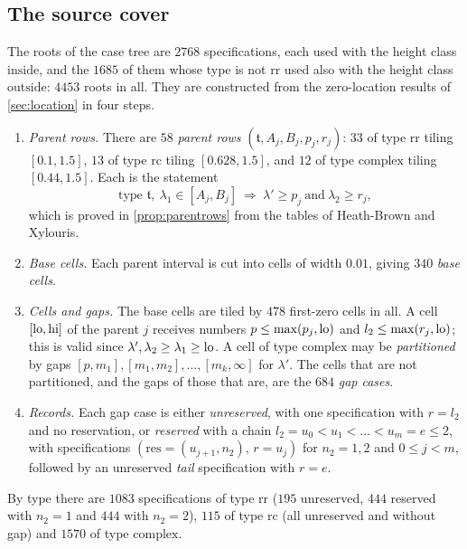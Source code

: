 \subsection{The source cover}\label{subsec:sourcecover}
The roots of the case tree are $2768$ specifications, each used with the height class
$\mathrm{inside}$, and the $1685$ of them whose type is not $\mathrm{rr}$ used also with the height
class $\mathrm{outside}$: $4453$ roots in all. They are constructed from the zero-location results of
\cref{sec:location} in four steps.
\begin{enumerate}[(1)]
  \item \emph{Parent rows.} There are $58$ \emph{parent rows} $(\mathfrak t,A_j,B_j,p_j,r_j)$: $33$ of type
    $\mathrm{rr}$ tiling $[0.1,1.5]$, $13$ of type $\mathrm{rc}$ tiling $[0.628,1.5]$, and $12$ of type
    $\mathrm{complex}$ tiling $[0.44,1.5]$. Each is the statement
    \begin{equation}\tag{T2}\label{eq:T2}
      \text{type }\mathfrak t,\ \lambda_1\in[A_j,B_j]\ \Longrightarrow\ \lambda'\ge p_j\ \text{and}\ \lambda_2\ge r_j,
    \end{equation}
    which is proved in \cref{prop:parentrows} from the tables of Heath-Brown and Xylouris.
  \item \emph{Base cells.} Each parent interval is cut into cells of width $0.01$, giving $340$
    \emph{base cells}.
  \item \emph{Cells and gaps.} The base cells are tiled by $478$ first-zero cells in all. A cell
    $[\mathrm{lo},\mathrm{hi}]$ of the parent $j$ receives numbers $p\le\max(p_j,\mathrm{lo})$ and $l_2\le\max(r_j,\mathrm{lo})$; this is
    valid since $\lambda',\lambda_2\ge\lambda_1\ge\mathrm{lo}$. A cell of type
    $\mathrm{complex}$ may be \emph{partitioned} by gaps $[p,m_1],[m_1,m_2],\dots,[m_k,\infty]$ for
    $\lambda'$. The cells that are not partitioned, and the gaps of those that are, are the $684$
    \emph{gap cases}.
  \item \emph{Records.} Each gap case is either \emph{unreserved}, with one specification with
    $r=l_2$ and no reservation, or \emph{reserved} with a chain $l_2=u_0<u_1<\dots<u_m=e\le2$,
    with specifications $(\mathrm{res}=(u_{j+1},n_2),\,r=u_j)$ for $n_2=1,2$ and $0\le j<m$,
    followed by an unreserved \emph{tail} specification with $r=e$.
\end{enumerate}
By type there are $1083$ specifications of type $\mathrm{rr}$ ($195$ unreserved, $444$ reserved
with $n_2=1$ and $444$ with $n_2=2$), $115$ of type $\mathrm{rc}$ (all unreserved and without gap)
and $1570$ of type $\mathrm{complex}$.

